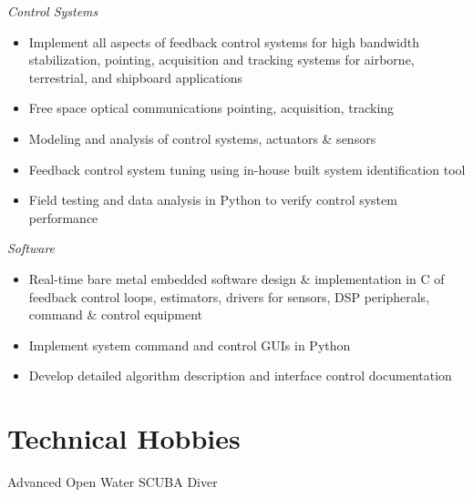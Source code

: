 \documentclass[margin,line]{resume}
\begin{document}
\begin{resume}
    \textsl{Control Systems}\\ \vspace{-4mm}
    		\begin{itemize} \itemsep -2pt
    			\item Implement all aspects of feedback control systems for high bandwidth stabilization, pointing, acquisition and tracking systems for airborne, terrestrial, and shipboard applications
			\item Free space optical communications pointing, acquisition, tracking
    			\item Modeling and analysis of control systems, actuators \& sensors
    			\item Feedback control system tuning using in-house built system identification tool
        		\item Field testing and data analysis in Python to verify control system performance
    		\end{itemize}\vspace{-4mm}
     
     \textsl{Software} \\ \vspace{-4mm}
     \begin{itemize} \itemsep -2pt
	    \item Real-time bare metal embedded software design \& implementation in C of feedback control loops, estimators, drivers for sensors, DSP peripherals, command \& control equipment
        \item Implement system command and control GUIs in Python
        \item Develop detailed algorithm description and interface control documentation
    \end{itemize} \vspace{-2.25mm}
  
\section{\mysidestyle Technical Hobbies}
Advanced Open Water SCUBA Diver 

\begin{comment}

	\textsc{Embedded Systems Intern}\hfill \textbf{June 2014 - October 2014}\\ \vspace{-4mm}
    	\begin{itemize} \itemsep -2pt
    		\item LTSpice simulation across temperature and part tolerance to verify closed-loop frequency response of analog current control loop used as a motor driver
    		\item Schematic updates incorporating simulation lessons, layout, routing and bring-up of PCBA
    		\item Purchase PCBA components, including overages
    	\end{itemize} \vspace{-2.25mm}


\end{comment}
\end{resume}
\end{document}
